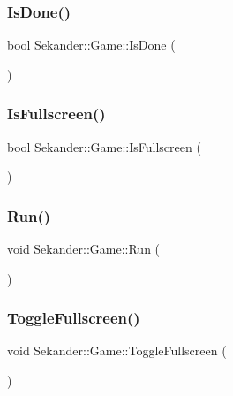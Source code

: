 \subsubsection{\texorpdfstring{Is\+Done()}{IsDone()}}
{\footnotesize\ttfamily bool Sekander\+::\+Game\+::\+Is\+Done (\begin{DoxyParamCaption}{ }\end{DoxyParamCaption})}

\mbox{\label{classSekander_1_1Game_aa919e9a5695d21c1ab19b2c8abe54041}} 
\subsubsection{\texorpdfstring{Is\+Fullscreen()}{IsFullscreen()}}
{\footnotesize\ttfamily bool Sekander\+::\+Game\+::\+Is\+Fullscreen (\begin{DoxyParamCaption}{ }\end{DoxyParamCaption})}

\mbox{\label{classSekander_1_1Game_ac944cfcfb5783b7788e591cd748ee51e}} 
\subsubsection{\texorpdfstring{Run()}{Run()}}
{\footnotesize\ttfamily void Sekander\+::\+Game\+::\+Run (\begin{DoxyParamCaption}{ }\end{DoxyParamCaption})\hspace{0.3cm}{\ttfamily [private]}}

\mbox{\label{classSekander_1_1Game_a2bf4207f57e28e619fcdf383079c3a9d}} 
\subsubsection{\texorpdfstring{Toggle\+Fullscreen()}{ToggleFullscreen()}}
{\footnotesize\ttfamily void Sekander\+::\+Game\+::\+Toggle\+Fullscreen (\begin{DoxyParamCaption}{ }\end{DoxyParamCaption})}



